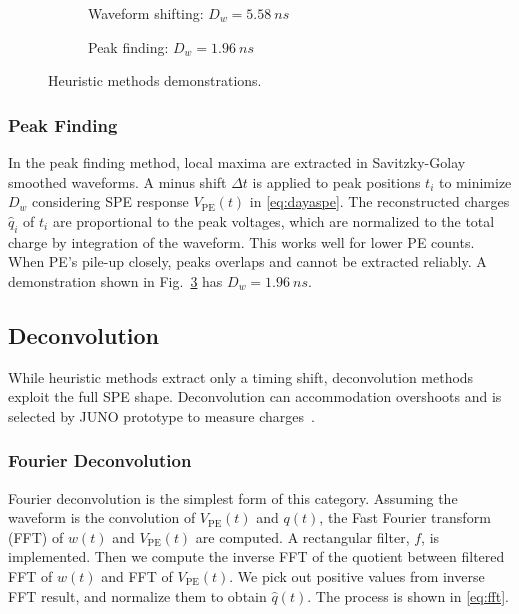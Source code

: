 \begin{figure}[H]
  \begin{subfigure}{0.5\textwidth}
    \centering
    \scalebox{0.36}{}
    \caption{\label{fig:shifting}Waveform shifting: $D_w = \SI{5.58}{ns}$}
  \end{subfigure}
  \begin{subfigure}{0.5\textwidth}
    \centering
    \scalebox{0.36}{}
    \caption{\label{fig:peak}Peak finding: $D_w = \SI{1.96}{ns}$}
  \end{subfigure}
  \caption{Heuristic methods demonstrations.}
\end{figure}

\subsubsection{Peak Finding}
\label{sec:findpeak}

In the peak finding method, local maxima are extracted in Savitzky-Golay smoothed waveforms.  A minus shift $\Delta t$ is applied to peak positions $t_i$ to minimize $D_w$ considering SPE response $V_\mathrm{PE}(t)$ in \eqref{eq:dayaspe}. The reconstructed charges $\hat{q}_i$ of $t_i$ are proportional to the peak voltages, which are normalized to the total charge by integration of the waveform.  This works well for lower PE counts. When PE's pile-up closely, peaks overlaps and cannot be extracted reliably. A demonstration shown in Fig.~\ref{fig:peak} has $D_w = \SI{1.96}{ns}$. 

\subsection{Deconvolution}
While heuristic methods extract only a timing shift, deconvolution methods exploit the full SPE shape.  Deconvolution can accommodation overshoots and is selected by JUNO prototype to measure charges~\cite{zhang_comparison_2019}.

\subsubsection{Fourier Deconvolution}

Fourier deconvolution is the simplest form of this category.  Assuming the waveform is the convolution of $V_\mathrm{PE}(t)$ and $q(t)$, the Fast Fourier transform (FFT) of $w(t)$ and $V_\mathrm{PE}(t)$ are computed. A rectangular filter, $f$, is implemented. Then we compute the inverse FFT of the quotient between filtered FFT of $w(t)$ and FFT of $V_\mathrm{PE}(t)$. We pick out positive values from inverse FFT result, and normalize them to obtain $\hat{q}(t)$. The process is shown in \eqref{eq:fft}. 

